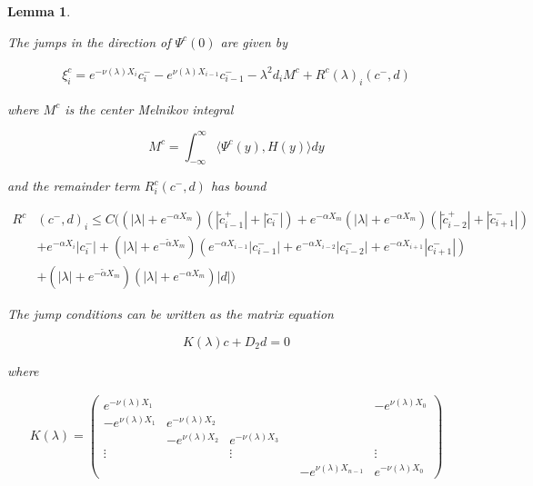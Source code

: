 \documentclass[12pt]{article}
\newtheorem{lemma}{Lemma}
\begin{document}
\begin{lemma}\label{jumpcenteradj}

The jumps in the direction of $\Psi^c(0)$ are given by

\begin{align}\label{xic}
\xi^c_i = e^{-\nu(\lambda) X_i} c_i^- - e^{\nu(\lambda) X_{i-1}} c_{i-1}^- - \lambda^2 d_i M^c + R^c(\lambda)_i(c^-, d)
\end{align}

where $M^c$ is the center Melnikov integral

\begin{equation}\label{Mc}
M^c =  \int_{-\infty}^\infty \langle \Psi^c(y), H(y) \rangle dy 
\end{equation}

and the remainder term $R^c_i(c^-, d)$ has bound

\begin{align}\label{Rc}
R^c&(c^-, d)_i \leq C \Big(
(|\lambda| + e^{-\alpha X_m})(|\tilde{c}_{i-1}^+| + |\tilde{c}_{i}^-|) + e^{-\alpha X_m}(|\lambda| + e^{-\alpha X_m})( |\tilde{c}_{i-2}^+| + |\tilde{c}_{i+1}^-|)  \nonumber \\
&+ e^{-\alpha X_i} |c_i^-| + (|\lambda| + e^{-\tilde{\alpha} X_m})( e^{-\alpha X_{i-1}} |c_{i-1}^-| + e^{-\alpha X_{i-2}} |c_{i-2}^-| + e^{-\alpha X_{i+1}} |c_{i+1}^-|) \\
&+ (|\lambda| + e^{-\tilde{\alpha} X_m})(|\lambda| + e^{-\alpha X_m})|d|
\Big) \nonumber
\end{align}

The jump conditions can be written as the matrix equation

\begin{equation}\label{matrixjumpc}
K(\lambda) c + D_2 d = 0
\end{equation}

where

\begin{align*}
K(\lambda) =  
\begin{pmatrix}
e^{-\nu(\lambda)X_1} & & & & & -e^{\nu(\lambda)X_0} \\
-e^{\nu(\lambda)X_1} & e^{-\nu(\lambda)X_2} \\
& -e^{\nu(\lambda)X_2} & e^{-\nu(\lambda)X_3} \\
\vdots & & \vdots & &&  \vdots \\
& & & & -e^{\nu(\lambda)X_{n-1}} & e^{-\nu(\lambda)X_0} 
\end{pmatrix}
\end{align*}


\end{lemma}
\end{document}
